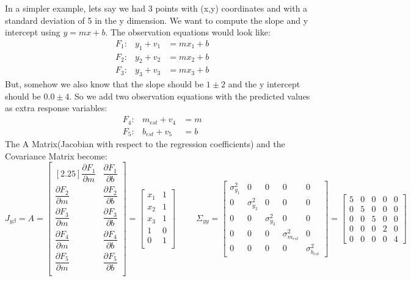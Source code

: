 \documentclass{article}
\begin{document}
	In a simpler example, lets say we had 3 points with (x,y) coordinates and with a standard deviation of 5 in the y dimension.  We want to compute the slope and y intercept using $y=mx+b$.  The observation equations would look like:
	\begin{align*}
	&F_1:& y_1 + v_1 &= mx_1 + b \\
	&F_2:& y_2 + v_2 &= mx_2 + b \\
	&F_3:& y_3 + v_3 &= mx_3 + b
	\end{align*}
	But, somehow we also know that the slope should be $1\pm2$ and the y intercept should be $0.0 \pm 4$.  So we add two observation equations with the predicted values as extra response variables:
	\begin{align*}
	&F_4:& m_{est} + v_4 &= m \\
	&F_5:& b_{est} + v_5 &= b
	\end{align*}
	The A Matrix(Jacobian with respect to the regression coefficients) and the Covariance Matrix become:
	\[
	J_{y\beta} = 
	A = 
	\begin{bmatrix}[2.25]
	\dfrac{\partial F_1}{\partial m} & \dfrac{\partial F_1}{\partial b} \\
	\dfrac{\partial F_2}{\partial m} & \dfrac{\partial F_2}{\partial b} \\
	\dfrac{\partial F_3}{\partial m} & \dfrac{\partial F_3}{\partial b} \\
	\dfrac{\partial F_4}{\partial m} & \dfrac{\partial F_4}{\partial b} \\
	\dfrac{\partial F_5}{\partial m} & \dfrac{\partial F_5}{\partial b} \\
	\end{bmatrix}
	= 
	\begin{bmatrix}
	x_1 & 1 \\
	x_2 & 1 \\
	x_3 & 1 \\
	1 & 0 \\
	0 & 1 \\
	\end{bmatrix}
	\hspace{1cm}
	\Sigma_{yy} = 
	\begin{bmatrix}
	\sigma_{y_1}^2 & 0            & 0            & 0            & 0            \\
	0            & \sigma_{y_2}^2 & 0            & 0            & 0            \\
	0            & 0            & \sigma_{y_3}^2 & 0            & 0            \\
	0            & 0            & 0            & \sigma_{m_{est}}^2 & 0            \\
	0            & 0            & 0            & 0            & \sigma_{b_{est}}^2
	\end{bmatrix}
	= 
	\begin{bmatrix}
	5 & 0 & 0 & 0 & 0 \\
	0 & 5 & 0 & 0 & 0 \\
	0 & 0 & 5 & 0 & 0 \\
	0 & 0 & 0 & 2 & 0 \\
	0 & 0 & 0 & 0 & 4
	\end{bmatrix}
	\]
	
\end{document}
